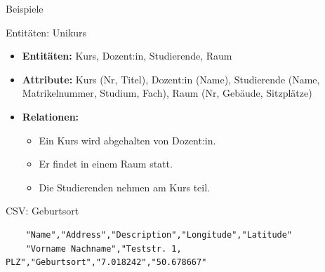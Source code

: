 \begin{frame}[fragile]{Beispiele}
\begin{block}{Entitäten: Unikurs}
    \begin{itemize}
        \item \textbf{Entitäten:} Kurs, Dozent:in, Studierende, Raum
        \item \textbf{Attribute:} Kurs (Nr, Titel), Dozent:in (Name), Studierende (Name, Matrikelnummer, Studium, Fach), Raum (Nr, Gebäude, Sitzplätze)
        \item \textbf{Relationen:}
        \begin{itemize}
            \item Ein Kurs wird abgehalten von Dozent:in.
            \item Er findet in einem Raum statt.
            \item Die Studierenden nehmen am Kurs teil.
        \end{itemize}
    \end{itemize}
\end{block}

\begin{block}{CSV: Geburtsort}\scriptsize
\begin{verbatim}
    "Name","Address","Description","Longitude","Latitude"
    "Vorname Nachname","Teststr. 1, PLZ","Geburtsort","7.018242","50.678667"
\end{verbatim}
\end{block}
\end{frame}


